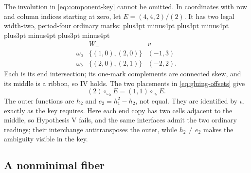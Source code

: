 \documentclass[11pt,a4paper]{amsart}
\numberwithin{equation}{section}
\theoremstyle{plain}
\theoremstyle{definition}
\begin{document}
The involution in \eqref{eq:component-key} cannot be omitted.  In coordinates with row and column indices starting at zero, let \(E=(4,4,2)/(2)\).  It has two legal width-two, period-four ordinary marks:
{\abovedisplayskip=14pt plus3pt minus4pt \belowdisplayskip=14pt plus3pt minus4pt
 \abovedisplayshortskip=14pt plus3pt minus4pt \belowdisplayshortskip=14pt plus3pt minus4pt
\[
 \begin{array}{c|c|c}
 &W_-&v\\ \hline
 \omega_a&\{(1,0),(2,0)\}&(-1,3)\\
 \omega_b&\{(2,0),(2,1)\}&(-2,2).
 \end{array}
\]}
Each is its end intersection; its one-mark complements are connected skew, and its middle is a ribbon, so IV holds.  The two placements in \eqref{eq:gluing-offsets} give
\[
 (2)\circ_{\omega_a}E=(1,1)\circ_{\omega_b}E.
\]
The outer functions are \(h_2\) and \(e_2=h_1^2-h_2\), not equal.  They are identified by \(\iota\), exactly as the key requires.  Here each end copy has two cells adjacent to the middle, so Hypothesis V fails, and the same interfaces admit the two ordinary readings; their interchange antitransposes the outer, while \(h_2\ne e_2\) makes the ambiguity visible in the key.

\subsection{A nonminimal fiber}
\end{document}
